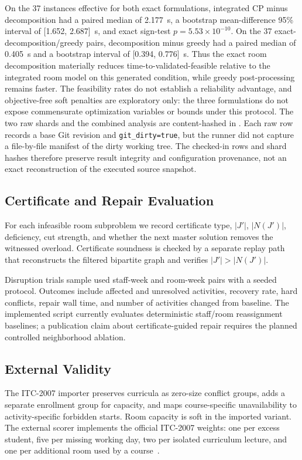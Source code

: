 On the 37 instances effective for both exact formulations, integrated CP minus decomposition had a paired median of 2.177~s, a bootstrap mean-difference 95\% interval of [1.652, 2.687]~s, and exact sign-test $p=5.53\times10^{-10}$.
On the 37 exact-decomposition/greedy pairs, decomposition minus greedy had a paired median of 0.405~s and a bootstrap interval of [0.394, 0.776]~s.
Thus the exact room decomposition materially reduces time-to-validated-feasible relative to the integrated room model on this generated condition, while greedy post-processing remains faster.
The feasibility rates do not establish a reliability advantage, and objective-free soft penalties are exploratory only: the three formulations do not expose commensurate optimization variables or bounds under this protocol.
The two raw shards and the combined analysis are content-hashed in . %
Each raw row records a base Git revision and \texttt{git\_dirty=true}, but the runner did not capture a file-by-file manifest of the dirty working tree.
The checked-in rows and shard hashes therefore preserve result integrity and configuration provenance, not an exact reconstruction of the executed source snapshot.

\subsection{Certificate and Repair Evaluation}
For each infeasible room subproblem we record certificate type, $|J'|$, $|N(J')|$, deficiency, cut strength, and whether the next master solution removes the witnessed overload.
Certificate soundness is checked by a separate replay path that reconstructs the filtered bipartite graph and verifies $|J'|>|N(J')|$.

Disruption trials sample used staff-week and room-week pairs with a seeded protocol.
Outcomes include affected and unresolved activities, recovery rate, hard conflicts, repair wall time, and number of activities changed from baseline.
The implemented script currently evaluates deterministic staff/room reassignment baselines; a publication claim about certificate-guided repair requires the planned controlled neighborhood ablation.

\subsection{External Validity}
The ITC-2007 importer preserves curricula as zero-size conflict groups, adds a separate enrollment group for capacity, and maps course-specific unavailability to activity-specific forbidden starts.
Room capacity is soft in the imported variant.
The external scorer implements the official ITC-2007 weights: one per excess student, five per missing working day, two per isolated curriculum lecture, and one per additional room used by a course~\cite{digaspero2007itc}.

